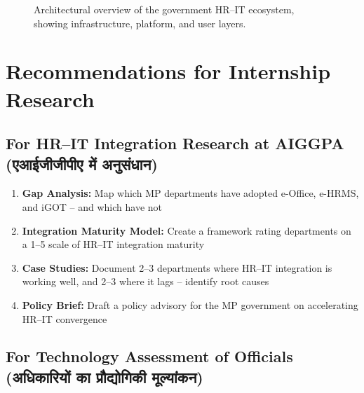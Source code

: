 \documentclass[12pt,a4paper]{article}
\newcommand{\hindi}[1]{{\hindifont #1}}
\begin{document}
\begin{figure}[H]
\caption{Architectural overview of the government HR--IT ecosystem, showing infrastructure, platform, and user layers.}
\label{fig:ecosystem}
\end{figure}

\section{Recommendations for Internship Research}

\subsection{For HR--IT Integration Research at AIGGPA (\hindi{एआईजीजीपीए में अनुसंधान})}

\begin{enumerate}
  \item \textbf{Gap Analysis:} Map which MP departments have adopted e-Office, e-HRMS, and iGOT -- and which have not
  \item \textbf{Integration Maturity Model:} Create a framework rating departments on a 1--5 scale of HR--IT integration maturity
  \item \textbf{Case Studies:} Document 2--3 departments where HR--IT integration is working well, and 2--3 where it lags -- identify root causes
  \item \textbf{Policy Brief:} Draft a policy advisory for the MP government on accelerating HR--IT convergence
\end{enumerate}

\subsection{For Technology Assessment of Officials (\hindi{अधिकारियों का प्रौद्योगिकी मूल्यांकन})}
\end{document}
